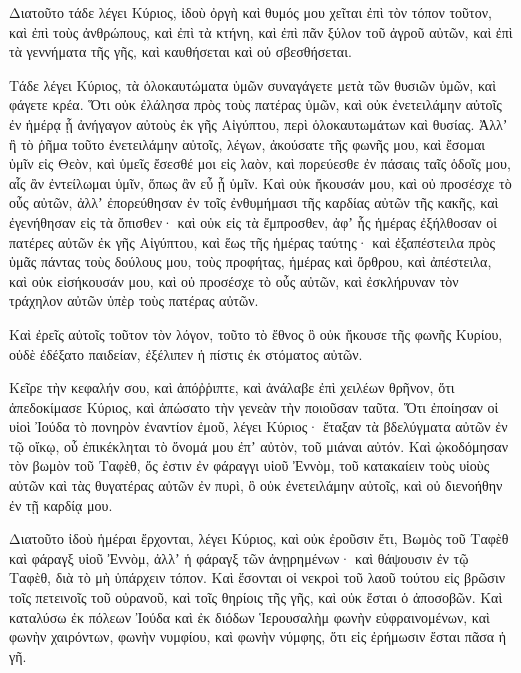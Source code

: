 {\par }{\PP {}Διατοῦτο τάδε λέγει Κύριος, ἰδοὺ ὀργὴ καὶ θυμός μου χεῖται ἐπὶ τὸν τόπον τοῦτον, καὶ ἐπὶ τοὺς ἀνθρώπους, καὶ ἐπὶ τὰ κτήνη, καὶ ἐπὶ πᾶν ξύλον τοῦ ἀγροῦ αὐτῶν, καὶ ἐπὶ τὰ γεννήματα τῆς γῆς, καὶ καυθήσεται καὶ οὐ σβεσθήσεται.
\par }{\PP {}Τάδε λέγει Κύριος, τὰ ὁλοκαυτώματα ὑμῶν συναγάγετε μετὰ τῶν θυσιῶν ὑμῶν, καὶ φάγετε κρέα.
Ὅτι οὐκ ἐλάλησα πρὸς τοὺς πατέρας ὑμῶν, καὶ οὐκ ἐνετειλάμην αὐτοῖς ἐν ἡμέρᾳ ᾗ ἀνήγαγον αὐτοὺς ἐκ γῆς Αἰγύπτου, περὶ ὁλοκαυτωμάτων καὶ θυσίας.
Ἀλλʼ ἢ τὸ ῥῆμα τοῦτο ἐνετειλάμην αὐτοῖς, λέγων, ἀκούσατε τῆς φωνῆς μου, καὶ ἔσομαι ὑμῖν εἰς Θεὸν, καὶ ὑμεῖς ἔσεσθέ μοι εἰς λαὸν, καὶ πορεύεσθε ἐν πάσαις ταῖς ὁδοῖς μου, αἷς ἂν ἐντείλωμαι ὑμῖν, ὅπως ἂν εὖ ᾖ ὑμῖν.
Καὶ οὐκ ἤκουσάν μου, καὶ οὐ προσέσχε τὸ οὖς αὐτῶν, ἀλλʼ ἐπορεύθησαν ἐν τοῖς ἐνθυμήμασι τῆς καρδίας αὐτῶν τῆς κακῆς, καὶ ἐγενήθησαν εἰς τὰ ὄπισθεν· καὶ οὐκ εἰς τὰ ἔμπροσθεν,
ἀφʼ ἧς ἡμέρας ἐξήλθοσαν οἱ πατέρες αὐτῶν ἐκ γῆς Αἰγύπτου, καὶ ἕως τῆς ἡμέρας ταύτης· καὶ ἐξαπέστειλα πρὸς ὑμᾶς πάντας τοὺς δούλους μου, τοὺς προφήτας, ἡμέρας καὶ ὄρθρου, καὶ ἀπέστειλα,
καὶ οὐκ εἰσήκουσάν μου, καὶ οὐ προσέσχε τὸ οὖς αὐτῶν, καὶ ἐσκλήρυναν τὸν τράχηλον αὐτῶν ὑπὲρ τοὺς πατέρας αὐτῶν.
\par }{\PP {}Καὶ ἐρεῖς αὐτοῖς τοῦτον τὸν λόγον,
τοῦτο τὸ ἔθνος ὃ οὐκ ἤκουσε τῆς φωνῆς Κυρίου, οὐδὲ ἐδέξατο παιδείαν, ἐξέλιπεν ἡ πίστις ἐκ στόματος αὐτῶν.
\par }{\PP {}Κεῖρε τὴν κεφαλήν σου, καὶ ἀπόῤῥιπτε, καὶ ἀνάλαβε ἐπὶ χειλέων θρῆνον, ὅτι ἀπεδοκίμασε Κύριος, καὶ ἀπώσατο τὴν γενεὰν τὴν ποιοῦσαν ταῦτα.
Ὅτι ἐποίησαν οἱ υἱοὶ Ἰούδα τὸ πονηρὸν ἐναντίον ἐμοῦ, λέγει Κύριος· ἔταξαν τὰ βδελύγματα αὐτῶν ἐν τῷ οἴκῳ, οὗ ἐπικέκληται τὸ ὄνομά μου ἐπʼ αὐτὸν, τοῦ μιάναι αὐτόν.
Καὶ ᾠκοδόμησαν τὸν βωμὸν τοῦ Ταφὲθ, ὅς ἐστιν ἐν φάραγγι υἱοῦ Ἐννὸμ, τοῦ κατακαίειν τοὺς υἱοὺς αὐτῶν καὶ τὰς θυγατέρας αὐτῶν ἐν πυρὶ, ὃ οὐκ ἐνετειλάμην αὐτοῖς, καὶ οὐ διενοήθην ἐν τῇ καρδίᾳ μου.
\par }{\PP {}Διατοῦτο ἰδοὺ ἡμέραι ἔρχονται, λέγει Κύριος, καὶ οὐκ ἐροῦσιν ἔτι, Βωμὸς τοῦ Ταφὲθ καὶ φάραγξ υἱοῦ Ἐννὸμ, ἀλλʼ ἡ φάραγξ τῶν ἀνῃρημένων· καὶ θάψουσιν ἐν τῷ Ταφὲθ, διὰ τὸ μὴ ὑπάρχειν τόπον.
Καὶ ἔσονται οἱ νεκροὶ τοῦ λαοῦ τούτου εἰς βρῶσιν τοῖς πετεινοῖς τοῦ οὐρανοῦ, καὶ τοῖς θηρίοις τῆς γῆς, καὶ οὐκ ἔσται ὁ ἀποσοβῶν.
Καὶ καταλύσω ἐκ πόλεων Ἰούδα καὶ ἐκ διόδων Ἱερουσαλὴμ φωνὴν εὐφραινομένων, καὶ φωνὴν χαιρόντων, φωνὴν νυμφίου, καὶ φωνὴν νύμφης, ὅτι εἰς ἐρήμωσιν ἔσται πᾶσα ἡ γῆ.

}
